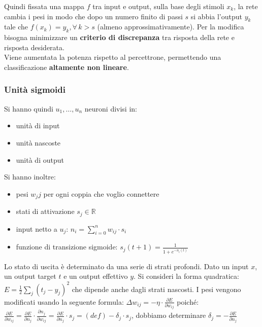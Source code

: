 Quindi fissata una mappa $f$ tra input e output, sulla base degli stimoli $x_k$, la rete cambia i pesi in modo che dopo un numero finito di passi $s$ si abbia l'output $y_k$ tale che $f(x_k)=y_k,\forall\,k>s$ (almeno approssimativamente). Per la modifica bisogna minimizzare un \textbf{criterio di discrepanza} tra risposta della rete e risposta desiderata.\\


Viene aumentata la potenza rispetto al percettrone, permettendo una classificazione \textbf{altamente non lineare}.\\ 

\subsubsection{Unità sigmoidi}
Si hanno quindi $u_1,\ldots, u_n$ neuroni divisi in: \begin{itemize} 
    \item unità di input 
    \item unità nascoste 
    \item unità di output 
\end{itemize} 
Si hanno inoltre: 
    \begin{itemize} 
    \item pesi $w_jj$ per ogni coppia che voglio connettere 
    \item stati di attivazione $s_j\in \mathbb{R}$ 
    \item input netto a $u_j$: $n_i=\displaystyle\sum_{i=0}^n w_{ij}\cdot s_i$ \item funzione di transizione sigmoide: $s_j(t+1)=\displaystyle \frac{1}{1+e^{-n_i(t)}}$ 
\end{itemize}

Lo stato di uscita è determinato da una serie di strati profondi. Dato un input $x$, un output target $t$ e un output effettivo $y$. Si consideri la forma quadratica: $E=\frac{1}{2}\sum_j(t_j-y_j)^2$ che dipende anche dagli strati nascosti. 
I pesi vengono modificati usando la seguente formula: $\displaystyle\Delta w_{ij}=-\eta\cdot\frac{\partial E}{\partial w_{ij}}$ poiché: \\ $\displaystyle\frac{\partial E}{\partial w_{ij}}= \frac{\partial E}{\partial n_{j}}\cdot \frac{\partial n_j}{\partial w_{ij}}= \frac{\partial E}{\partial n_{j}}\cdot s_j=(def)-\delta_j\cdot s_j$, dobbiamo determinare  $\displaystyle\delta_j=-\frac{\partial E}{\partial n_{j}}$

